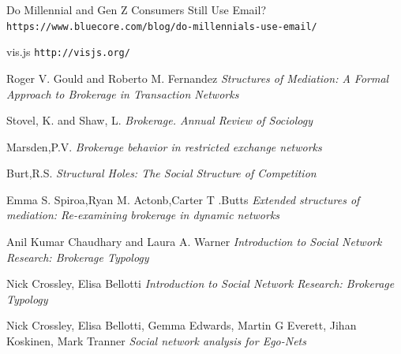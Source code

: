\documentclass[slovak,master,public,dept460,male,cpdeclaration,oneside]{diploma}
\begin{document}
\begin{thebibliography}{99}
	 Do Millennial and Gen Z Consumers Still Use Email? 
		\newline
		\texttt{https://www.bluecore.com/blog/do-millennials-use-email/}
		
	 vis.js
		\newline
		\texttt{http://visjs.org/}
		
	 Roger V. Gould and Roberto M. Fernandez
		\newline
		\textit{Structures of Mediation: A Formal Approach to Brokerage in
	 Transaction Networks}
	 
	 Stovel, K. and Shaw, L.
		\newline
		\textit{Brokerage. Annual Review of Sociology}
		
	 Marsden,P.V.
		\newline
		\textit{Brokerage behavior in restricted exchange networks}
		
	 Burt,R.S.
		\newline
		\textit{Structural Holes: The Social Structure of Competition}	

	  Emma S. Spiroa,Ryan M. Actonb,Carter T .Butts
		\newline						
		\textit{Extended structures of mediation: Re-examining brokerage in dynamic networks}
		
	 Anil Kumar Chaudhary and Laura A. Warner
		\newline						
		\textit{Introduction to Social Network Research: Brokerage Typology}
		
	 Nick Crossley, Elisa Bellotti
		\newline						
		\textit{Introduction to Social Network Research: Brokerage Typology}
			
	 Nick Crossley, Elisa Bellotti, Gemma Edwards, Martin G Everett, Jihan Koskinen, Mark Tranner
		\newline						
		\textit{Social network analysis for Ego-Nets}

\end{thebibliography}


\newpage

 

\end{document}
